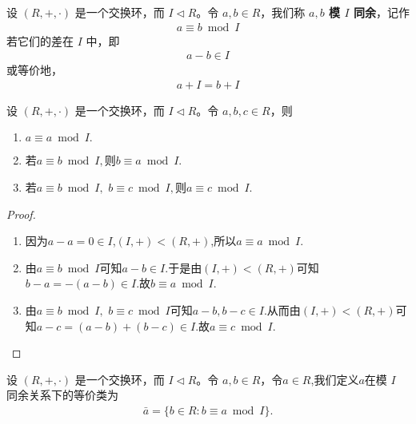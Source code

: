 \documentclass[../../main.tex]{subfiles}
\begin{document}
\begin{definition}[模理想同余]
设 $(R, +, \cdot)$ 是一个交换环，而 $I \lhd R$。令 $a, b \in R$，我们称 \textbf{$a, b$ 模 $I$ 同余}，记作
\begin{align*}
a \equiv b \bmod I
\end{align*}
若它们的差在 $I$ 中，即
\begin{align*}
a - b \in I
\end{align*}
或等价地，
\begin{align*}
a + I = b + I
\end{align*}
\end{definition}

\begin{proposition}[模理想同余是一个等价关系]\label{proposition:模理想同余是一个等价关系}
设 $(R, +, \cdot)$ 是一个交换环，而 $I \lhd R$。令 $a, b ,c\in R$，则
\begin{enumerate}[(1)]
\item $a\equiv a \bmod I.$

\item 若$a\equiv b \bmod I,$则$b\equiv a \bmod I.$

\item 若$a\equiv b \bmod I,$ $b\equiv c \bmod I,$则$a\equiv c \bmod I.$
\end{enumerate}
\end{proposition}
\begin{proof}
\begin{enumerate}[(1)]
\item 因为$a-a=0\in I$,$(I,+)<(R,+)$,所以$a\equiv a \bmod I.$

\item 由$a\equiv b \bmod I$可知$a-b\in I.$于是由$(I,+)<(R,+)$可知$b-a=-(a-b)\in I$.故$b\equiv a \bmod I.$

\item 由$a\equiv b \bmod I,$ $b\equiv c \bmod I$可知$a-b,b-c\in I$.从而由$(I,+)<(R,+)$可知$a-c=(a-b)+(b-c)\in I.$故$a\equiv c \bmod I.$
\end{enumerate}

\end{proof}

\begin{definition}\label{definition:模理想同余等价类}
设 $(R, +, \cdot)$ 是一个交换环，而 $I \lhd R$。令 $a, b \in R$，令$a\in R$,我们定义$a$在模 $I$ 同余关系下的等价类为
\begin{align*}
\bar{a}=\{b\in R:b\equiv a \bmod I\}.
\end{align*}
\end{definition}
\end{document}
